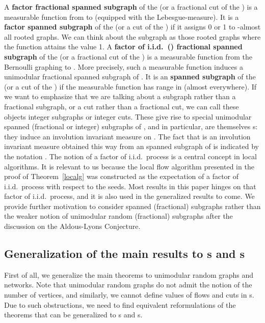 \documentclass[12pt,a4paper]{article}
\renewcommand{\:}{\colon}
\begin{document}
A \textbf{factor fractional spanned subgraph} of the   (or a fractional cut of the  ) is a measurable function from  to  (equipped with the Lebesgue-measure). 
It is a \textbf{factor spanned subgraph} of the   (or a cut of the  ) if it assigns 0 or 1 to -almost all rooted graphs. 
We can think about the subgraph as those rooted graphs where the function attains the value 1. 
A \textbf{factor of i.i.d.\ () fractional spanned subgraph} of the   (or a fractional cut of the  ) is a measurable function from the Bernoulli graphing to . 
More precisely, such a measurable function induces a unimodular fractional spanned subgraph of . 
It is an \textbf{ spanned subgraph} of the   (or a cut of the  ) if the measurable function has range in  (almost everywhere). 
If we want to emphasize that we are talking about a subgraph rather than a fractional subgraph, or a cut rather than a fractional cut, we can call these objects integer subgraphs or integer cuts. 
These give rise to special unimodular spanned (fractional or integer) subgraphs of , and in particular, are themselves s: they induce an involution invariant measure  on . 
The fact that  is an involution invariant measure obtained this way from an  spanned subgraph of  is indicated by the notation .  
The notion of a factor of i.i.d.\ process is a central concept in local algorithms. It is relevant to us because the local flow algorithm presented in the proof of Theorem~\ref{localg} was constructed as the expectation of a factor of i.i.d.\ process with respect to the seeds. 
Most results in this paper hinges on that factor of i.i.d.\ process, and it is also used in the generalized results to come.  
We provide further motivation to consider  spanned (fractional) subgraphs rather than the weaker notion of unimodular random (fractional) subgraphs after the discussion on the Aldous-Lyons Conjecture. 




\subsection{Generalization of the main results to s and s}



First of all, we generalize the main theorems to unimodular random graphs and networks. 
Note that unimodular random graphs do not admit the notion of the number of vertices, and similarly, we cannot define values of flows and cuts in s. 
Due to such obstructions, we need to find equivalent reformulations of the theorems that can be generalized to s and s. 
\end{document}
